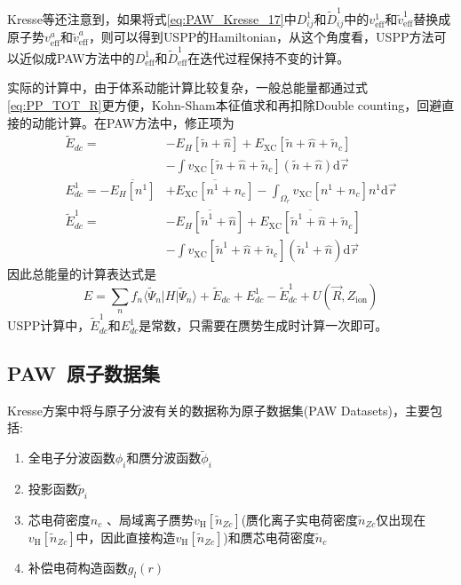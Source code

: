 \textrm{Kresse}等还注意到，如果将式\eqref{eq:PAW_Kresse_17}中$D_{ij}^1$和$\tilde D_{ij}^1$中的$v_{\mathrm{eff}}^1$和$\tilde v_{\mathrm{eff}}^1$替换成原子势$v_{\mathrm{eff}}^a$和$\tilde v_{\mathrm{eff}}^a$，则可以得到\textrm{USPP}的\textrm{Hamiltonian}，从这个角度看，\textrm{USPP}方法可以近似成\textrm{PAW}方法中的$D_{\mathrm{eff}}^1$和$\tilde D_{\mathrm{eff}}^1$在迭代过程保持不变的计算。
%

实际的计算中，由于体系动能计算比较复杂，一般总能量都通过式\eqref{eq:PP_TOT_R}更方便，\textrm{Kohn-Sham}本征值求和再扣除\textrm{Double counting}，回避直接的动能计算。在\textrm{PAW}方法中，修正项为
	\begin{equation}
		\begin{aligned}
			\tilde E_{dc}=&-E_H[\tilde n+\hat n]+E_{\mathrm{XC}}[\tilde n+\hat n+\tilde n_c]\\
			&-\int v_{\mathrm{XC}}[\tilde n+\hat n+\tilde n_c](\tilde n+\hat n)\mathrm{d}\vec r\\
			E_{dc}^1=-\overline{E_H[n^1]}&+\overline{E_{\mathrm{XC}}[n^1+n_c]}-\int_{\Omega_r}v_{\mathrm{XC}}[n^1+n_c]n^1\mathrm{d}\vec r\\
			\tilde E_{dc}^1=&-\overline{E_H[\tilde n^1+\hat n]}+\overline{E_{\mathrm{XC}}[\tilde n^1+\hat n+\tilde n_c]}\\
			&-\int v_{\mathrm{XC}}[\tilde n^1+\hat n+\tilde n_c](\tilde n^1+\hat n)\mathrm{d}\vec r
		\end{aligned}
	\end{equation}
因此总能量的计算表达式是
	$$E=\sum_nf_n\langle\tilde\Psi_n|H|\tilde\Psi_n\rangle+\tilde E_{dc}+E_{dc}^1-\tilde E_{dc}^1+U(\vec R,Z_{\mathrm{ion}})$$
\textrm{USPP}计算中，$\tilde E_{dc}^1$和$E_{dc}^1$是常数，只需要在赝势生成时计算一次即可。

\subsection{\rm{PAW~}原子数据集}
\textrm{Kresse}方案中将与原子分波有关的数据称为原子数据集(\textrm{PAW Datasets})，主要包括:~
\begin{enumerate}
	\item 全电子分波函数$\phi_i$和赝分波函数$\tilde\phi_i$
	\item 投影函数$\tilde p_i$
	\item 芯电荷密度$n_c$ 、局域离子赝势$v_{\mathrm H}[\tilde n_{Zc}]$(赝化离子实电荷密度$\tilde n_{Zc}$仅出现在$v_{\mathrm H}[\tilde n_{Zc}]$中，因此直接构造$v_{\mathrm H}[\tilde n_{Zc}]$)和赝芯电荷密度$\tilde n_c$
	\item 补偿电荷构造函数$g_l(r)$
\end{enumerate}

